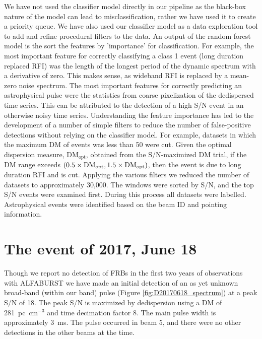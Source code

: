 \documentclass[a4paper,fleqn,usenatbib]{mnras}
\begin{document}
We have not used the classifier model directly in our pipeline as the black-box
nature of the model can lead to misclassification, rather we have used it to
create a priority queue.  We have also used our classifier model as a data
exploration tool to add and refine procedural filters to the data.  An output of
the random forest model is the sort the features by 'importance' for
classification. For example, the most important feature for correctly
classifying a class 1 event (long duration replaced RFI) was the length of the
longest period of the dynamic spectrum with a derivative of zero. This makes
sense, as wideband RFI is replaced by a mean-zero noise spectrum. The most
important features for correctly predicting an astrophysical pulse were the
statistics from coarse pixelization of the dedispersed time series. This can be
attributed to the detection of a high S/N event in an otherwise noisy time
series.  Understanding the feature importance has led to the development of a
number of simple filters to reduce the number of false-positive detections
without relying on the classifier model. For example, datasets in which the
maximum DM of events was less than 50 were cut.  Given the optimal dispersion
measure, DM$_{\textrm{opt}}$, obtained from the S/N-maximized DM trial,  if the
DM range exceeds $(0.5 \times {\rm DM}_{\textrm{opt}}, 1.5 \times {\rm
DM}_{\textrm{opt}})$, then the event is due to long duration RFI and is cut.
Applying the various filters we reduced the number of datasets to approximately
30,000. The windows were sorted by S/N, and the top S/N events were examined
first.  During this process all datasets were labelled.  Astrophysical events
were identified based on the beam ID and pointing information.



\section{The event of 2017, June 18}
\label{sec:18062017}

Though we report no detection of FRBs in the first two years of observations
with ALFABURST we have made an initial detection of an as yet unknown broad-band
(within our band) pulse (Figure \ref{fig:D20170618_spectrum}) at a peak S/N of
18. The peak S/N is maximized by dedispersion using a DM of 281~pc~cm$^{-3}$ and
time decimation factor 8. The main pulse width is approximately 3~ms. The pulse
occurred in beam 5, and there were no other detections in the other beams at the
time.
\end{document}
